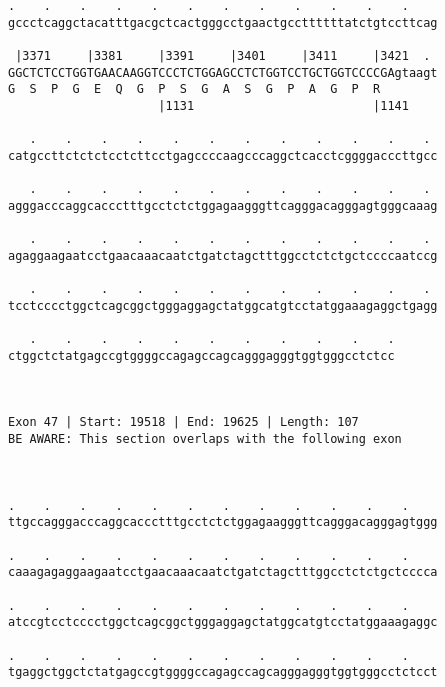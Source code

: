 \documentclass{article}
\begin{document}
\begin{Verbatim}
.    .    .    .    .    .    .    .    .    .    .    .    
gccctcaggctacatttgacgctcactgggcctgaactgccttttttatctgtccttcag
                                                            
 |3371     |3381     |3391     |3401     |3411     |3421  . 
GGCTCTCCTGGTGAACAAGGTCCCTCTGGAGCCTCTGGTCCTGCTGGTCCCCGAgtaagt
G  S  P  G  E  Q  G  P  S  G  A  S  G  P  A  G  P  R        
                     |1131                         |1141    
  
   .    .    .    .    .    .    .    .    .    .    .    . 
catgccttctctctcctcttcctgagccccaagcccaggctcacctcggggacccttgcc
                                                            
   .    .    .    .    .    .    .    .    .    .    .    . 
agggacccaggcaccctttgcctctctggagaagggttcagggacagggagtgggcaaag
                                                            
   .    .    .    .    .    .    .    .    .    .    .    . 
agaggaagaatcctgaacaaacaatctgatctagctttggcctctctgctccccaatccg
                                                            
   .    .    .    .    .    .    .    .    .    .    .    . 
tcctcccctggctcagcggctgggaggagctatggcatgtcctatggaaagaggctgagg
                                                            
   .    .    .    .    .    .    .    .    .    .    .
ctggctctatgagccgtggggccagagccagcagggagggtggtgggcctctcc
                                                      
                                                      
 
Exon 47 | Start: 19518 | End: 19625 | Length: 107
BE AWARE: This section overlaps with the following exon



.    .    .    .    .    .    .    .    .    .    .    .    
ttgccagggacccaggcaccctttgcctctctggagaagggttcagggacagggagtggg
                                                            
.    .    .    .    .    .    .    .    .    .    .    .    
caaagagaggaagaatcctgaacaaacaatctgatctagctttggcctctctgctcccca
                                                            
.    .    .    .    .    .    .    .    .    .    .    .    
atccgtcctcccctggctcagcggctgggaggagctatggcatgtcctatggaaagaggc
                                                            
.    .    .    .    .    .    .    .    .    .    .    .    
tgaggctggctctatgagccgtggggccagagccagcagggagggtggtgggcctctcct
                                                            

\end{Verbatim}
\end{document}
